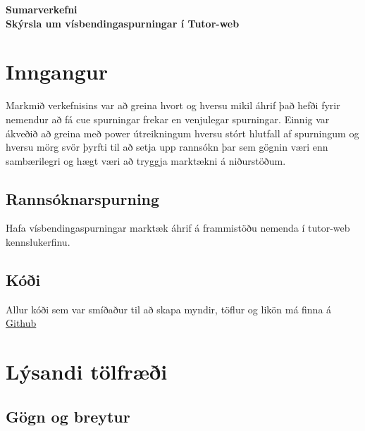\documentclass[
  10pt,
]{article}
\author{}
\date{\vspace{-2.5em}}
\begin{document}
\begin{center}
\LARGE{\textbf{Sumarverkefni}}\\
\vspace*{2\baselineskip}
\Large{\textbf{Skýrsla um vísbendingaspurningar í Tutor-web}}
\end{center}
\thispagestyle{empty}
\newpage

\hypertarget{inngangur}{%
\section{Inngangur}\label{inngangur}}

Markmið verkefnisins var að greina hvort og hversu mikil áhrif það hefði fyrir nemendur að fá cue spurningar frekar en venjulegar spurningar. Einnig var ákveðið að greina með power útreikningum hversu stórt hlutfall af spurningum og hversu mörg svör þyrfti til að setja upp rannsókn þar sem gögnin væri enn sambærilegri og hægt væri að tryggja marktækni á niðurstöðum.

\hypertarget{rannsuxf3knarspurning}{%
\subsection{Rannsóknarspurning}\label{rannsuxf3knarspurning}}

Hafa vísbendingaspurningar marktæk áhrif á frammistöðu nemenda í tutor-web kennslukerfinu.

\hypertarget{kuxf3uxf0i}{%
\subsection{Kóði}\label{kuxf3uxf0i}}

Allur kóði sem var smíðaður til að skapa myndir, töflur og likön má finna á \href{https://github.com/ingunnlilja/myrepo}{Github}

\hypertarget{luxfdsandi-tuxf6lfruxe6uxf0i}{%
\section{Lýsandi tölfræði}\label{luxfdsandi-tuxf6lfruxe6uxf0i}}

\hypertarget{guxf6gn-og-breytur}{%
\subsection{Gögn og breytur}\label{guxf6gn-og-breytur}}
\end{document}
